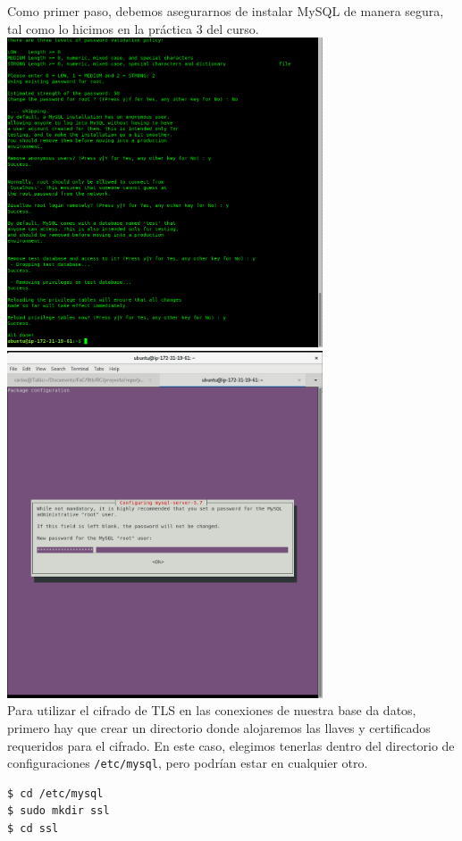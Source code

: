 \documentclass[12pt]{article}
\begin{document}
Como primer paso, debemos asegurarnos de instalar \textsf{MySQL} de manera segura, tal como lo hicimos en la práctica 3 del curso. \\
\includegraphics[width=0.7\textwidth]{mysql_secure_installation} \\
\includegraphics[width=0.7\textwidth]{mysql_install}\\


Para utilizar el cifrado de \textsf{TLS} en las conexiones de nuestra base da datos, primero hay que crear un directorio donde alojaremos las llaves y certificados requeridos para el cifrado. En este caso, elegimos tenerlas dentro del directorio de configuraciones \texttt{/etc/mysql}, pero podrían estar en cualquier otro.

\begin{verbatim}
$ cd /etc/mysql
$ sudo mkdir ssl
$ cd ssl
\end{verbatim}
\end{document}
